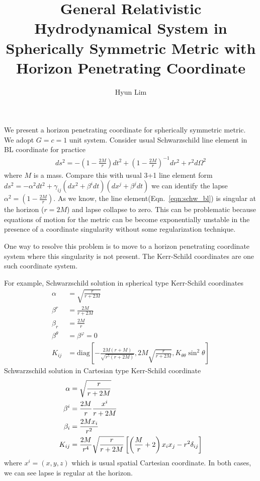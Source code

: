 \documentclass[prd]{revtex4}
\begin{document}
\title{General Relativistic Hydrodynamical System in Spherically Symmetric Metric with Horizon Penetrating Coordinate}

\author{Hyun Lim}

\maketitle

We present a horizon penetrating coordinate for spherically symmetric metric. We adopt $G=c=1$ unit system. Consider usual Schwarzschild line element in BL coordinate for practice
\begin{align}
\label{eqn:schw_bl}
ds^2 = - \left(1- \frac{2M}{r} \right) dt^2 + \left(1- \frac{2M}{r} \right)^{-1} dr^2 + r^2 d\Omega^2 
\end{align}
where $M$ is a mass. Compare this with usual 3+1 line element form $ds^2 = - \alpha^2 dt^2 + \gamma_{ij} ( dx^2 + \beta^i dt)(dx^j + \beta^j dt)$ we can identify the lapse $\alpha^2 = \left(1- \frac{2M}{r} \right)$. As we know, the line element(Eqn.~\ref{eqn:schw_bl}) is singular at the horizon ($r=2M$) and lapse collapse to zero. This can be problematic because equations of motion for the metric can be become exponentially unstable in the presence of a coordinate singularity without some regularization technique.

One way to resolve this problem is to move to a horizon penetrating coordinate system where this singularity is not present. The Kerr-Schild coordinates are one such coordinate system. 

For example, Schwarzschild solution in spherical type Kerr-Schild coordinates
\begin{align}
\alpha &= \sqrt{\frac{r}{r+2M}} \\
\beta^r &= \frac{2M}{r+2M} \\
\beta_r &=\frac{2M}{r} \\
\beta^\theta &= \beta^\varphi = 0 \\
K_{ij} &= \textrm{diag} \left[ -\frac{2M(r+M)}{\sqrt{r^5 (r+2M)}} , 2M \sqrt{\frac{r}{r+2M}}, K_{\theta \theta} \sin^2 \theta \right]
\end{align}
Schwarzschild solution in Cartesian type Kerr-Schild coordinate
\begin{align}
\alpha &= \sqrt{\frac{r}{r+2M}} \\
\beta^i &= \frac{2M}{r} \frac{x^i}{r+2M} \\
\beta_i &=\frac{2M x_i}{r^2} \\
K_{ij} &= \-\frac{2M}{r^4} \sqrt{\frac{r}{r+2M}} \left[ \left( \frac{M}{r}+2 \right) x_i x_j - r^2 \delta_{ij} \right]
\end{align}
where $x^i = (x,y,z)$ which is usual spatial Cartesian coordinate. In both cases, we can see lapse is regular at the horizon.
\end{document}
